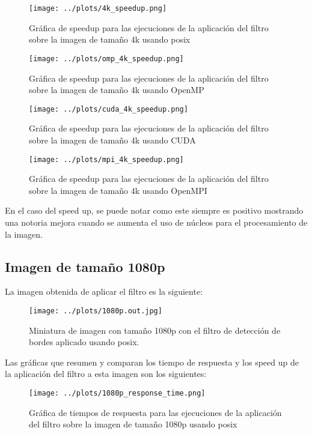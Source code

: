 \begin{figure}[H]
    \centering
    \texttt{[image: ../plots/4k\_speedup.png]}
    \caption{Gráfica de speedup para las ejecuciones de la aplicación del filtro sobre la imagen de tamaño 4k usando posix}
\end{figure}

\begin{figure}[H]
    \centering
    \texttt{[image: ../plots/omp\_4k\_speedup.png]}
    \caption{Gráfica de speedup para las ejecuciones de la aplicación del filtro sobre la imagen de tamaño 4k usando OpenMP}
\end{figure}

\begin{figure}[H]
    \centering
    \texttt{[image: ../plots/cuda\_4k\_speedup.png]}
    \caption{Gráfica de speedup para las ejecuciones de la aplicación del filtro sobre la imagen de tamaño 4k usando CUDA}
\end{figure}

\begin{figure}[H]
    \centering
    \texttt{[image: ../plots/mpi\_4k\_speedup.png]}
    \caption{Gráfica de speedup para las ejecuciones de la aplicación del filtro sobre la imagen de tamaño 4k usando OpenMPI}
\end{figure}

En el caso del speed up, se puede notar como este siempre es positivo mostrando una notoria mejora cuando se aumenta el uso de núcleos para el procesamiento de la imagen.

\subsection{Imagen de tamaño 1080p}

La imagen obtenida de aplicar el filtro es la siguiente:

\begin{figure}[H]
    \centering
    \texttt{[image: ../plots/1080p.out.jpg]}
    \caption{Miniatura de imagen con tamaño 1080p con el filtro de detección de bordes aplicado usando posix.}
\end{figure}

Las gráficas que resumen y comparan los tiempo de respuesta y los speed up de la aplicación del filtro a esta imagen son los siguientes:

\begin{figure}[H]
    \centering
    \texttt{[image: ../plots/1080p\_response\_time.png]}
    \caption{Gráfica de tiempos de respuesta para las ejecuciones de la aplicación del filtro sobre la imagen de tamaño 1080p usando posix}
\end{figure}

